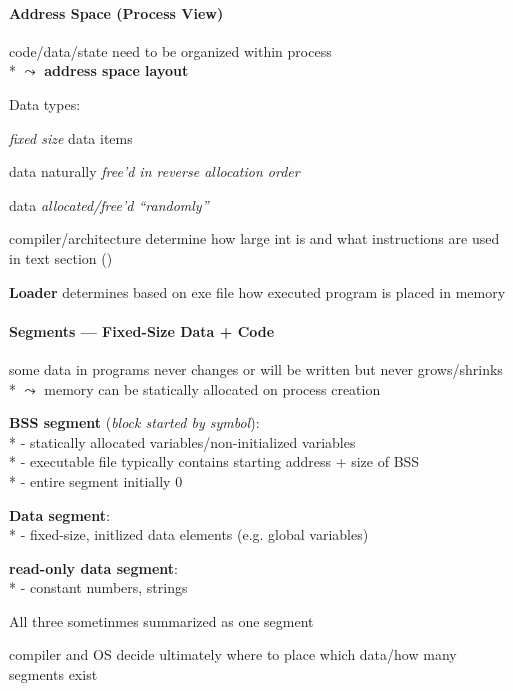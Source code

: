 \paragraph{Address Space (Process View)}
\begin{items}
	\item code/data/state need to be organized within process \\*
		\( \leadsto \) \textbf{address space layout}
	\item Data types:
	\begin{enumeration}
		\item \emph{fixed size} data items
		\item data naturally \emph{free'd in reverse allocation order}
		\item data \emph{allocated/free'd "`randomly"'}
	\end{enumeration}
	\item compiler/architecture determine how large int is and what instructions are used in text section ()
	\item \textbf{Loader} determines based on exe file how executed program is placed in memory
\end{items}

\paragraph{Segments --- Fixed-Size Data + Code}
\begin{items}
	\item some data in programs never changes or will be written but never grows/shrinks \\*
		\( \leadsto \) memory can be statically allocated on process creation
	\item \textbf{BSS segment} (\emph{block started by symbol}): \\*
		- statically allocated variables/non-initialized variables \\*
		- executable file typically contains starting address + size of BSS \\*
		- entire segment initially 0
	\item \textbf{Data segment}: \\*
		- fixed-size, initlized data elements (e.g. global variables)
	\item \textbf{read-only data segment}: \\*
		- constant numbers, strings
	\item All three sometinmes summarized as one segment
	\item compiler and OS decide ultimately where to place which data/how many segments exist
\end{items}

